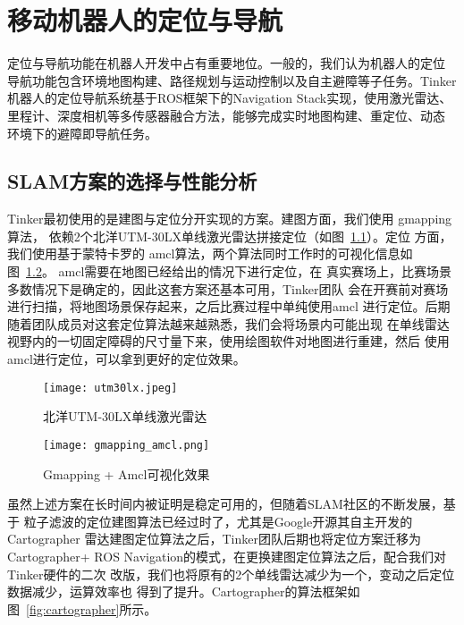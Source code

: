 \chapter{移动机器人的定位与导航}
\label{cha:chapter03}

定位与导航功能在机器人开发中占有重要地位。一般的，我们认为机器人的定位
导航功能包含环境地图构建、路径规划与运动控制以及自主避障等子任务。Tinker
机器人的定位导航系统基于ROS框架下的Navigation Stack实现，使用激光雷达、
里程计、深度相机等多传感器融合方法，能够完成实时地图构建、重定位、动态
环境下的避障即导航任务。


\section{SLAM方案的选择与性能分析}

Tinker最初使用的是建图与定位分开实现的方案。建图方面，我们使用
gmapping算法\cite{grisettiyz2005improving}，
依赖2个北洋UTM-30LX单线激光雷达拼接定位（如图~\ref{fig:utm30lx}）。定位
方面，我们使用基于蒙特卡罗的
amcl算法\cite{fox2002kld}，两个算法同时工作时的可视化信息如图~\ref{fig:gmapping_amcl}。
amcl需要在地图已经给出的情况下进行定位，在
真实赛场上，比赛场景多数情况下是确定的，因此这套方案还基本可用，Tinker团队
会在开赛前对赛场进行扫描，将地图场景保存起来，之后比赛过程中单纯使用amcl
进行定位。后期随着团队成员对这套定位算法越来越熟悉，我们会将场景内可能出现
在单线雷达视野内的一切固定障碍的尺寸量下来，使用绘图软件对地图进行重建，然后
使用amcl进行定位，可以拿到更好的定位效果。

\begin{figure}
  \centering
  \texttt{[image: utm30lx.jpeg]}
  \caption{北洋UTM-30LX单线激光雷达}
  \label{fig:utm30lx}
\end{figure}


\begin{figure}
  \centering
  \texttt{[image: gmapping\_amcl.png]}
  \caption{Gmapping + Amcl可视化效果}
  \label{fig:gmapping_amcl}
\end{figure}

虽然上述方案在长时间内被证明是稳定可用的，但随着SLAM社区的不断发展，基于
粒子滤波的定位建图算法已经过时了，尤其是Google开源其自主开发的Cartographer
雷达建图定位算法\cite{hess2016real}之后，Tinker团队后期也将定位方案迁移为Cartographer+
ROS Navigation的模式，在更换建图定位算法之后，配合我们对Tinker硬件的二次
改版，我们也将原有的2个单线雷达减少为一个，变动之后定位数据减少，运算效率也
得到了提升。Cartographer的算法框架如图~\ref{fig:cartographer}所示。

